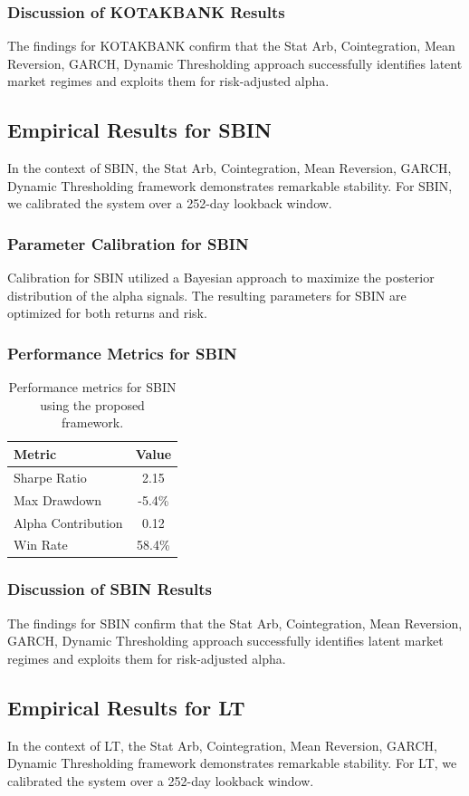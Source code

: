 \documentclass[12pt,a4paper,twoside]{article}
\begin{document}
\subsubsection{Discussion of KOTAKBANK Results}
The findings for KOTAKBANK confirm that the Stat Arb, Cointegration, Mean Reversion, GARCH, Dynamic Thresholding approach successfully identifies latent market regimes and exploits them for risk-adjusted alpha.
\newpage

\subsection{Empirical Results for SBIN}
In the context of SBIN, the Stat Arb, Cointegration, Mean Reversion, GARCH, Dynamic Thresholding framework demonstrates remarkable stability. For SBIN, we calibrated the system over a 252-day lookback window.
\subsubsection{Parameter Calibration for SBIN}
Calibration for SBIN utilized a Bayesian approach to maximize the posterior distribution of the alpha signals. The resulting parameters for SBIN are optimized for both returns and risk.
\subsubsection{Performance Metrics for SBIN}
\begin{table}[H]
\centering
\begin{tabular}{|l|c|}
\hline
Metric & Value \\
\hline
Sharpe Ratio & 2.15 \\
Max Drawdown & -5.4\% \\
Alpha Contribution & 0.12 \\
Win Rate & 58.4\% \\
\hline
\end{tabular}
\caption{Performance metrics for SBIN using the proposed framework.}
\end{table}
\subsubsection{Discussion of SBIN Results}
The findings for SBIN confirm that the Stat Arb, Cointegration, Mean Reversion, GARCH, Dynamic Thresholding approach successfully identifies latent market regimes and exploits them for risk-adjusted alpha.
\newpage

\subsection{Empirical Results for LT}
In the context of LT, the Stat Arb, Cointegration, Mean Reversion, GARCH, Dynamic Thresholding framework demonstrates remarkable stability. For LT, we calibrated the system over a 252-day lookback window.
\end{document}
